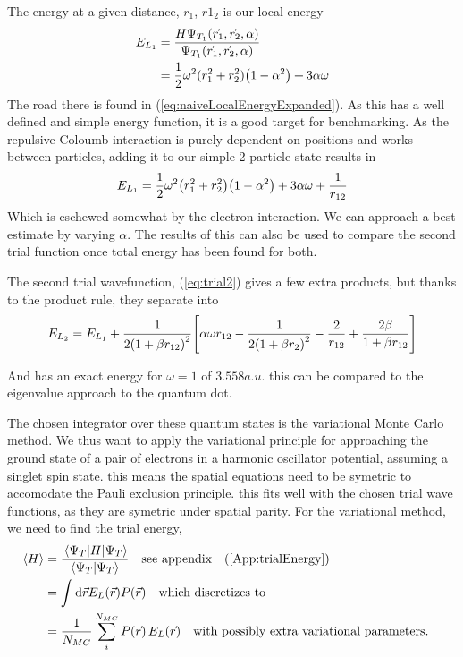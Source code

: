 \documentclass[10pt]{revtex4-1}
\begin{document}
The energy at a given distance, $r_1$, $r1_2$ is our local energy
\begin{align}
    E_{L_1} &= \frac{H \Psi_{T_1} \qty(\vec{r}_1, \vec{r}_2, \alpha )}{\Psi_{T_1} \qty(\vec{r}_1, \vec{r}_2, \alpha )}\nonumber \\
        &= \frac{1}{2}\omega^2 (r_1^2 + r_2^2)\qty(1 -\alpha^2 ) + 3\alpha \omega \label{eq:naiveLocalEnergy}
\end{align}
The road there is found in (\ref{eq:naiveLocalEnergyExpanded}). As this has a well defined and simple energy function, it is a good target for benchmarking.
As the repulsive Coloumb interaction is purely dependent on positions
and works between particles, adding it to our simple 2-particle state results in
\begin{align}
    E_{L_1} = \frac{1}{2} \omega^2 \qty(r_1^2 + r_2^2) \qty( 1 -\alpha^2 ) + 3\alpha \omega + \frac{1}{ r_{12} } \label{eq:firstLocalEnergy}
\end{align}
Which is eschewed somewhat by the electron interaction. We can approach a best estimate by varying $\alpha$. The results of this can also be used to compare
the second trial function once total energy has been found for both.

The second trial wavefunction, (\ref{eq:trial2}) gives a few extra products, but thanks to the product rule, they separate into
\begin{align}
    E_{L_2} = E_{L_1} + \frac{1}{ 2 \qty( 1 + \beta r_{12} )^{2} }
    \qty[ \alpha \omega r_{12} - \frac{ 1 }{ 2 \qty( 1 + \beta r_{2} )^{2} } - \frac{ 2 }{ r_{12} } + \frac{ 2 \beta }{ 1 + \beta r_{12} } ]
\end{align}

And has an exact energy for $\omega = 1$ of $3.558a.u$. this can be compared to the eigenvalue approach to the quantum dot\cite{project2pdf}.

The chosen integrator over these quantum states is the variational Monte Carlo method. We thus want to apply the variational principle for approaching
the ground state of a pair of electrons in a harmonic oscillator potential, assuming a singlet spin state. this means the spatial equations need to be
symetric to accomodate the Pauli exclusion principle. %
this fits well with the chosen trial wave functions, as they are symetric under spatial parity. For the variational method, we need to find the trial
energy,
\begin{align}
    \ev{H} &= \frac{ \ev{H}{\Psi_T} }{ \braket{\Psi_T} } \qq{see appendix} (\ref{App:trialEnergy}) \nonumber \\
        &= \int\dd\vec{r} E_L\qty(\vec{r}) P\qty(\vec{r}) \qq{which discretizes to } \nonumber \\
        &= \frac{1}{N_{MC}}\sum_i^{N_{MC}} P(\vec{r}) \, E_L(\vec{r}) \qq{with possibly extra variational parameters.}
\end{align}
\end{document}
